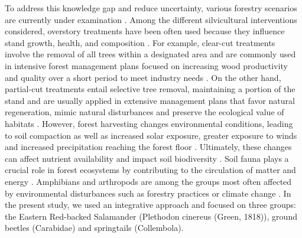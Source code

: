To address this knowledge gap and reduce uncertainty, various forestry scenarios are currently under examination \citep{royoDesiredREgenerationAssisted2023}. 
Among the different silvicultural interventions considered, overstory treatments have been often used because they influence stand growth, health, and composition \citep{Man2008Elevenyearresponses,Chaudhary2016Impactforest,MontoroGirona2018ConiferRegeneration,Ameray2021Forestcarbon}. 
For example, clear-cut treatments involve the removal of all trees within a designated area and are commonly used in intensive forest management plans focused on increasing wood productivity and quality over a short period to meet industry needs \citep{Ameray2021Forestcarbon}. 
On the other hand, partial-cut treatments entail selective tree removal, maintaining a portion of the stand and are usually applied in extensive management plans that favor natural regeneration, mimic natural disturbances and preserve the ecological value of habitats \citep{Barg1999Influencepartial,Irland2011Timberproductivity,Tong2020Forestmanagement,Ameray2021Forestcarbon}. 
However, forest harvesting changes environmental conditions, leading to soil compaction as well as increased solar exposure, greater exposure to winds and increased precipitation reaching the forest floor \citep{Keenan1993ecologicaleffects,Lindo2003Microbialbiomass,Heithecker2007Edgerelatedgradients}. 
Ultimately, these changes can affect nutrient availability and impact soil biodiversity \citep{Covington1981Changesforest,Lindo2003Microbialbiomass,Battigelli2004Shorttermimpact,rousseauLongtermEffectsBiomass2018}.
Soil fauna plays a crucial role in forest ecosystems by contributing to the circulation of matter and energy \citep{Seibold2021contributioninsects,Kudrin2023metaanalysiseffects}. 
Amphibians and arthropods are among the groups most often affected by environmental disturbances such as forestry practices \citep{Stuart2004Statustrends,Semlitsch2009Effectstimber,Hartshorn2021reviewforest} or climate change \citep{Alford1999Globalamphibian,Houlahan2000Quantitativeevidence,Pounds2006Widespreadamphibian,Warren2018projectedeffect}.
In the present study, we used an integrative approach and focused on three groups: the Eastern Red-backed Salamander (Plethodon cinereus (Green, 1818)), ground beetles (Carabidae) and springtails (Collembola).

